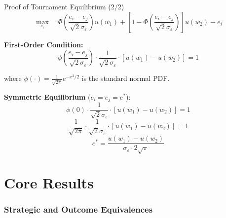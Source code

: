 \documentclass[xcolor={x11names}, aspectratio=169 ]{beamer}
\begin{document}
\begin{frame}{Proof of Tournament Equilibrium (2/2)}
$$\max_{e_i} \quad \Phi\left(\frac{e_i - e_j}{\sqrt{2}\sigma_\varepsilon}\right) u(w_1) + \left[1 - \Phi\left(\frac{e_i - e_j}{\sqrt{2}\sigma_\varepsilon}\right)\right] u(w_2) - e_i$$

\textbf{First-Order Condition:}
$$\phi\left(\frac{e_i - e_j}{\sqrt{2}\sigma_\varepsilon}\right) \cdot \frac{1}{\sqrt{2}\sigma_\varepsilon} \cdot [u(w_1) - u(w_2)] = 1$$

where $\phi(\cdot) = \frac{1}{\sqrt{2\pi}}e^{-x^2/2}$ is the standard normal PDF.

\textbf{Symmetric Equilibrium} ($e_i = e_j = e^*$):
$$\phi(0) \cdot \frac{1}{\sqrt{2}\sigma_\varepsilon} \cdot [u(w_1) - u(w_2)] = 1$$
$$\frac{1}{\sqrt{2\pi}} \cdot \frac{1}{\sqrt{2}\sigma_\varepsilon} \cdot [u(w_1) - u(w_2)] = 1$$
$$\boxed{e^* = \frac{u(w_1) - u(w_2)}{\sigma_\varepsilon \cdot 2\sqrt{\pi}}}$$
\end{frame}

\part{Core Results}
\section{Strategic and Outcome Equivalences}
\end{document}
